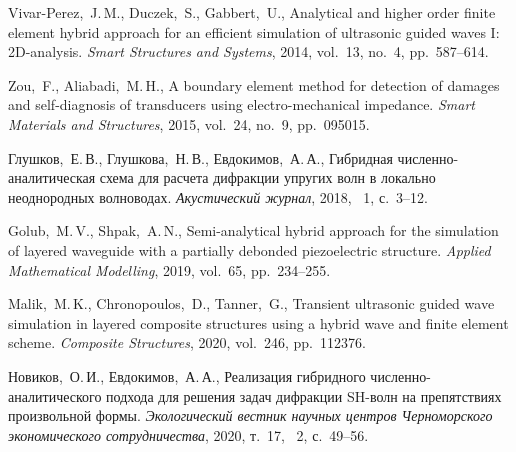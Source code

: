 \documentclass[press]{vestnik}
\begin{document}
\begin{thebibliography}{23}
Vivar-Perez,~J.\,M., Duczek,~S., Gabbert,~U., Analytical and higher order finite element hybrid approach for an efficient simulation of ultrasonic guided waves I: 2D-analysis. \emph{Smart Structures and Systems}, 2014, vol.~13, no.~4, pp.~587--614. 

Zou,~F., Aliabadi,~M.\,H., A boundary element method for detection of damages and self-diagnosis of transducers using electro-mechanical impedance. \emph{Smart Materials and Structures}, 2015, vol.~24, no.~9, pp.~095015. 

Глушков,~Е.\,В., Глушкова,~Н.\,В., Евдокимов,~А.\,А., Гибридная численно-аналитическая схема для расчета дифракции упругих волн в локально неоднородных волноводах. \emph{Акустический журнал}, 2018, \No~1, с.~3--12.  

Golub,~M.\,V., Shpak,~A.\,N., Semi-analytical hybrid approach for the simulation of layered waveguide with a partially debonded piezoelectric structure. \emph{Applied Mathematical Modelling}, 2019, vol.~65, pp.~234--255. 

Malik,~M.\,K., Chronopoulos,~D., Tanner,~G., Transient ultrasonic guided wave simulation in layered composite structures using a hybrid wave and finite element scheme. \emph{Composite Structures}, 2020, vol.~246, pp.~112376. 

Новиков,~О.\,И., Евдокимов,~А.\,А., Реализация гибридного численно-аналитического подхода для решения задач дифракции SH-волн на препятствиях произвольной формы. \emph{Экологический вестник научных центров Черноморского экономического сотрудничества}, 2020, т.~17, \No~2, с.~49--56.  


\end{thebibliography}
\end{document}
